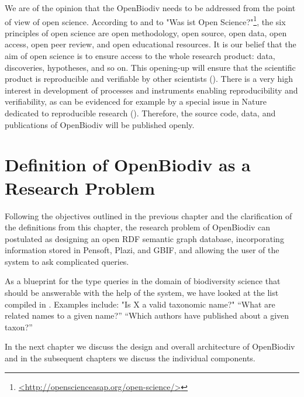 We are of the opinion that the OpenBiodiv needs to be addressed from the point of view of open science. According to \cite{kraker_case_2011} and to "Was ist Open Science?"\footnote{\href{http://openscienceasap.org/open-science/>}{<http://openscienceasap.org/open-science/>}}, the six principles of open science are open methodology, open source, open data, open access, open peer review, and open educational resources. It is our belief that the aim of open science is to ensure access to the whole research product: data, discoveries, hypotheses, and so on. This opening-up will ensure that the scientific product is reproducible and verifiable by other scientists (\cite{mietchen_transformative_2014}). There is a very high interest in development of processes and instruments enabling reproducibility and verifiability, as can be evidenced for example by a special issue in Nature dedicated to reproducible research (\cite{noauthor_challenges_2010}). Therefore, the source code, data, and publications of OpenBiodiv will be published openly.

\section{Definition of OpenBiodiv as a Research Problem}

Following the objectives outlined in the previous chapter and the clarification of the definitions from this chapter, the research problem of OpenBiodiv can postulated as designing an open RDF semantic graph database, incorporating information stored in Pensoft, Plazi, and GBIF, and allowing the user of the system to ask complicated queries. 

As a blueprint for the type queries in the domain of biodiversity science that should be answerable with the help of the system, we have looked at the list compiled in \cite{pro-ibiosphere_competency_2013}. Examples include: "Is X a valid taxonomic name?" ``What are related names to a given name?'' ``Which authors have published about a given taxon?''

In the next chapter we discuss the design and overall architecture of OpenBiodiv and in the subsequent chapters we discuss the individual components.
